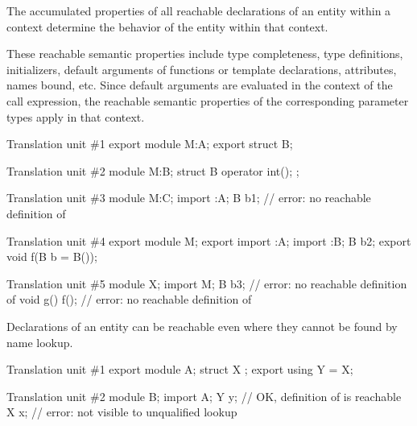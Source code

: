 \pnum
The accumulated properties of all reachable declarations of
an entity within a context
determine the behavior of the entity within that context.
\begin{note}
These reachable semantic properties include type completeness,
type definitions, initializers,
default arguments of functions or template declarations, attributes,
names bound, etc.
Since default arguments are evaluated in the context of the call expression,
the reachable semantic properties of the corresponding parameter types apply in
that context.
\begin{example}
\begin{codeblocktu}{Translation unit \#1}
export module M:A;
export struct B;
\end{codeblocktu}

\begin{codeblocktu}{Translation unit \#2}
module M:B;
struct B {
  operator int();
};
\end{codeblocktu}

\begin{codeblocktu}{Translation unit \#3}
module M:C;
import :A;
B b1;                           // error: no reachable definition of 
\end{codeblocktu}

\begin{codeblocktu}{Translation unit \#4}
export module M;
export import :A;
import :B;
B b2;
export void f(B b = B());
\end{codeblocktu}

\begin{codeblocktu}{Translation unit \#5}
module X;
import M;
B b3;                           // error: no reachable definition of 
void g() { f(); }               // error: no reachable definition of 
\end{codeblocktu}
\end{example}
\end{note}

\pnum
\begin{note}
Declarations of an entity can be reachable
even where they cannot be found by name lookup.
\end{note}
\begin{example}
\begin{codeblocktu}{Translation unit \#1}
export module A;
struct X {};
export using Y = X;
\end{codeblocktu}

\begin{codeblocktu}{Translation unit \#2}
module B;
import A;
Y y;                // OK, definition of  is reachable
X x;                // error:  not visible to unqualified lookup
\end{codeblocktu}
\end{example}
